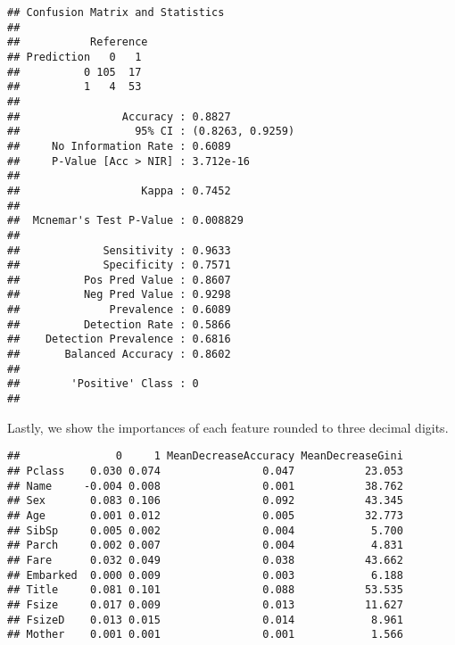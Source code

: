 \documentclass[
]{article}
\newenvironment{Shaded}{\begin{snugshade}}{\end{snugshade}}
\newcommand{\CommentTok}[1]{\textcolor[rgb]{0.56,0.35,0.01}{\textit{#1}}}
\newcommand{\DecValTok}[1]{\textcolor[rgb]{0.00,0.00,0.81}{#1}}
\newcommand{\FunctionTok}[1]{\textcolor[rgb]{0.13,0.29,0.53}{\textbf{#1}}}
\newcommand{\NormalTok}[1]{#1}
\newcommand{\SpecialCharTok}[1]{\textcolor[rgb]{0.81,0.36,0.00}{\textbf{#1}}}
\begin{document}
\begin{verbatim}
## Confusion Matrix and Statistics
## 
##           Reference
## Prediction   0   1
##          0 105  17
##          1   4  53
##                                           
##                Accuracy : 0.8827          
##                  95% CI : (0.8263, 0.9259)
##     No Information Rate : 0.6089          
##     P-Value [Acc > NIR] : 3.712e-16       
##                                           
##                   Kappa : 0.7452          
##                                           
##  Mcnemar's Test P-Value : 0.008829        
##                                           
##             Sensitivity : 0.9633          
##             Specificity : 0.7571          
##          Pos Pred Value : 0.8607          
##          Neg Pred Value : 0.9298          
##              Prevalence : 0.6089          
##          Detection Rate : 0.5866          
##    Detection Prevalence : 0.6816          
##       Balanced Accuracy : 0.8602          
##                                           
##        'Positive' Class : 0               
## 
\end{verbatim}

Lastly, we show the importances of each feature rounded to three decimal
digits.

\begin{Shaded}
\end{Shaded}

\begin{verbatim}
##               0     1 MeanDecreaseAccuracy MeanDecreaseGini
## Pclass    0.030 0.074                0.047           23.053
## Name     -0.004 0.008                0.001           38.762
## Sex       0.083 0.106                0.092           43.345
## Age       0.001 0.012                0.005           32.773
## SibSp     0.005 0.002                0.004            5.700
## Parch     0.002 0.007                0.004            4.831
## Fare      0.032 0.049                0.038           43.662
## Embarked  0.000 0.009                0.003            6.188
## Title     0.081 0.101                0.088           53.535
## Fsize     0.017 0.009                0.013           11.627
## FsizeD    0.013 0.015                0.014            8.961
## Mother    0.001 0.001                0.001            1.566
\end{verbatim}
\end{document}
